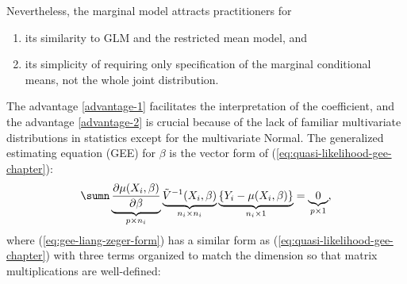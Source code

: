 Nevertheless, the marginal model attracts practitioners for 
\begin{enumerate}[label=(A\arabic*), ref=A\arabic*] 
\item\label{advantage-1}
its similarity to GLM and the restricted mean model, and
\item \label{advantage-2}
its simplicity of requiring only specification of the marginal conditional
means, not the whole joint distribution. 
\end{enumerate}
The advantage \eqref{advantage-1} facilitates
the interpretation of the coefficient, and the advantage \eqref{advantage-2} is crucial because of the lack of familiar multivariate distributions in statistics
except for the multivariate Normal. The generalized estimating equation
(GEE) for $\beta$ is the vector form of (\ref{eq:quasi-likelihood-gee-chapter}):
\begin{equation}
\sumn\underbrace{\frac{\partial\mu (X_{i},\beta)}{\partial\beta}}_{p\times n_{i}}
\underbrace{\tilde{V}^{-1}(X_{i},\beta)}_{n_{i}\times n_{i}}
\underbrace{\left\{ Y_{i}-\mu(X_{i},\beta)\right\} }_{n_{i}\times1}
= \underbrace{0}_{p\times 1},\label{eq:gee-liang-zeger-form}
\end{equation}
where (\ref{eq:gee-liang-zeger-form}) has a similar form as (\ref{eq:quasi-likelihood-gee-chapter})
with three terms organized to match the dimension so that matrix multiplications
are well-defined:
